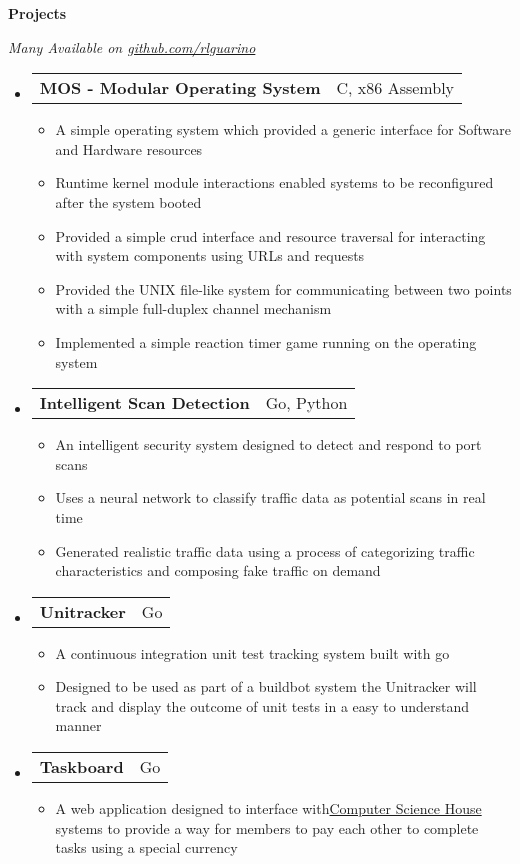 \documentclass[letterpaper,11pt]{article}
\makeatletter
\newcommand{\resheading}[1]{{\large \colorbox{mygrey}{\begin{minipage}{\textwidth}{\textbf{#1 \vphantom{p\^{E}}}}\end{minipage}}}}
\newcommand{\restwosubheading}[2]{
\begin{tabular*}{6.5in}{l@{\extracolsep{\fill}}r}
    \textbf{#1} & #2 \\
\end{tabular*}\vspace{-6pt}}
\makeatother
\begin{document}
\resheading{Projects}
  \footnotesize
  \textit{Many Available on {\href{http://www.github.com/rlguarino/}{github.com/rlguarino}}}
  \begin{itemize}
    \item
      \restwosubheading{MOS - Modular Operating System}{C, x86 Assembly}
      \begin{itemize}
        \item{A simple operating system which provided a generic interface for Software and Hardware resources}
        \item{Runtime kernel module interactions enabled systems to be reconfigured after the system booted}
        \item{Provided a simple crud interface and resource traversal for interacting with system components using URLs and requests}
        \item{Provided the UNIX file-like system for communicating between two points with a simple full-duplex channel mechanism}
        \item{Implemented a simple reaction timer game running on the operating system}
      \end{itemize}
    \item
      \restwosubheading{Intelligent Scan Detection}{Go, Python}
      \begin{itemize}
        \item{An intelligent security system designed to detect and respond to port scans}
        \item{Uses a neural network to classify traffic data as potential scans in real time}
        \item{Generated realistic traffic data using a process of categorizing traffic characteristics and composing fake traffic on demand}
      \end{itemize}
   \item
     \restwosubheading{Unitracker }{Go}
     \begin{itemize}
  \item{A continuous integration unit test tracking system built with go}
  \item{Designed to be used as part of a buildbot system the Unitracker will track and display the outcome of unit tests in a easy to understand manner}
     \end{itemize}
    \item
      \restwosubheading{Taskboard}{Go}
      \begin{itemize}
  \item{A web application designed to interface with{\href{http://csh.rit.edu}{Computer Science House} } systems to provide a way for members to pay each other to complete tasks using a special currency}

\end{itemize}
\end{itemize}
\end{document}
